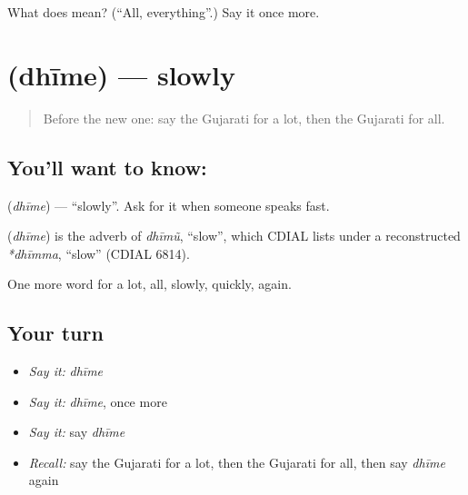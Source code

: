 \begin{tcolorbox}[breakable,colback=teal!4,colframe=teal!35!black,title={Before you move on}]
What does  mean? (\textquotedblleft{}All, everything\textquotedblright{}.) Say it once more.
\end{tcolorbox}
\section[\texorpdfstring{\gu{ધીમે} (dhīme)}{ધીમે (dhīme)}]{ (dhīme) — slowly}

\label{lesson:GU-C76-slowly}



\begin{quote}
Before the new one: say the Gujarati for a lot, then the Gujarati for all.
\end{quote}

\subsection*{You'll want to know: }
\textbf{} (\emph{dhīme}) — \textquotedblleft{}slowly\textquotedblright{}. Ask for it when someone speaks fast.

\begin{cousinweb}
\textbf{} (\emph{dhīme}) is the adverb of \emph{dhīmũ}, \textquotedblleft{}slow\textquotedblright{}, which CDIAL lists under a reconstructed \emph{*dhīmma}, \textquotedblleft{}slow\textquotedblright{} (CDIAL 6814).
\end{cousinweb}

\begin{grammarlens}[title={What you've built}]
One more word for a lot, all, slowly, quickly, again.
\end{grammarlens}

\subsection*{Your turn}
\begin{itemize}
\raggedright
  \item \emph{Say it:} \emph{dhīme}
  \item \emph{Say it:} \emph{dhīme}, once more
  \item \emph{Say it:} say \emph{dhīme}
  \item \emph{Recall:} say the Gujarati for a lot, then the Gujarati for all, then say \emph{dhīme} again
\end{itemize}

